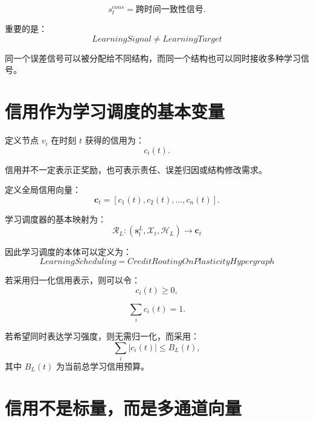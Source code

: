 \begin{equation}
s_t^{cons}
=
\text{跨时间一致性信号}.
\end{equation}

重要的是：
\begin{equation}
\boxed{
LearningSignal
\neq
LearningTarget
}
\end{equation}

同一个误差信号可以被分配给不同结构，而同一个结构也可以同时接收多种学习信号。


\section{信用作为学习调度的基本变量}

定义节点 $v_i$ 在时刻 $t$ 获得的信用为：
\begin{equation}
c_i(t).
\end{equation}

信用并不一定表示正奖励，也可表示责任、误差归因或结构修改需求。

定义全局信用向量：
\begin{equation}
\mathbf{c}_t
=
[
c_1(t),
c_2(t),
\ldots,
c_n(t)
].
\end{equation}

学习调度器的基本映射为：
\begin{equation}
\boxed{
\mathcal{R}_L:
(\mathbf{s}_t^L,\mathcal{X}_t,\mathcal{H}_L)
\rightarrow
\mathbf{c}_t
}
\end{equation}

因此学习调度的本体可以定义为：
\begin{equation}
\boxed{
LearningScheduling
=
CreditRoutingOnPlasticityHypergraph
}
\end{equation}

若采用归一化信用表示，则可以令：
\begin{equation}
c_i(t)\geq 0,
\end{equation}

\begin{equation}
\sum_i c_i(t)=1.
\end{equation}

若希望同时表达学习强度，则无需归一化，而采用：
\begin{equation}
\sum_i |c_i(t)|
\leq
B_L(t),
\end{equation}
其中 $B_L(t)$ 为当前总学习信用预算。


\section{信用不是标量，而是多通道向量}

